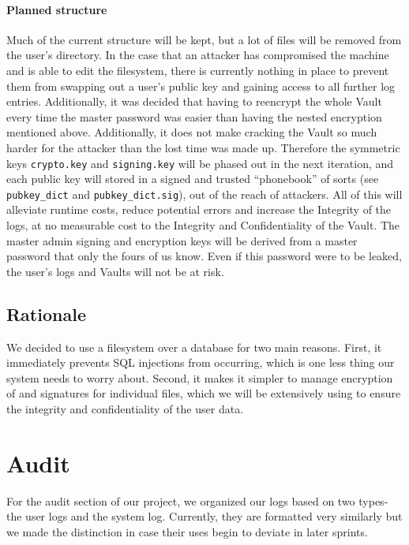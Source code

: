 \documentclass{article}
\begin{document}
\paragraph{Planned structure} Much of the current structure will be kept, but a lot of files will be removed from the user's directory. In the case that an attacker has compromised the machine and is able to edit the filesystem, there is currently nothing in place to prevent them from swapping out a user's public key and gaining access to all further log entries. Additionally, it was decided that having to reencrypt the whole Vault every time the master password was easier than having the nested encryption mentioned above. Additionally, it does not make cracking the Vault so much harder for the attacker than the lost time was made up. Therefore the symmetric keys \texttt{crypto.key} and \texttt{signing.key} will be phased out in the next iteration, and each public key will stored in a signed and trusted ``phonebook'' of sorts (see \texttt{pubkey\_dict} and \texttt{pubkey\_dict.sig}), out of the reach of attackers. All of this will alleviate runtime costs, reduce potential errors and increase the Integrity of the logs, at no measurable cost to the Integrity and Confidentiality of the Vault. The master admin signing and encryption keys will be derived from a master password that only the fours of us know. Even if this password were to be leaked, the user's logs and Vaults will not be at risk.

\subsection{Rationale}
\par We decided to use a filesystem over a database for two main reasons. First, it immediately prevents SQL injections from occurring, which is one less thing our system needs to worry about. Second, it makes it simpler to manage encryption of and signatures for individual files, which we will be extensively using to ensure the integrity and confidentiality of the user data.

\section{Audit}
For the audit section of our project, we organized our logs based on two types- the user logs and the system log. Currently, they are formatted very similarly but we made the distinction in case their uses begin to deviate in later sprints.
\end{document}

